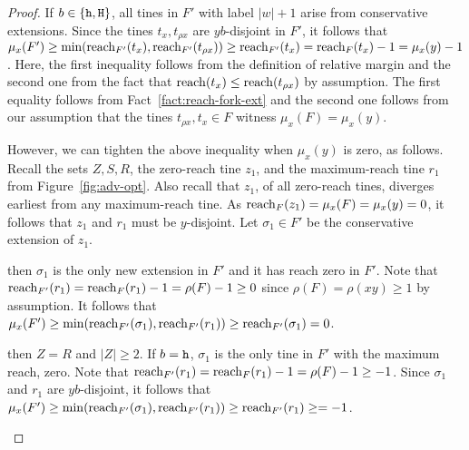 \begin{proof}
  If $b \in \{\mathtt{h}, \mathtt{H}\}$, 
  all tines in $F'$ with label $|w| + 1$ arise from conservative extensions. 
  Since the tines $t_x, t_{\rho x}$ are $yb$-disjoint in $F'$, 
  it follows that $\mu_x(F') \geq \min(\operatorname{reach}_{F'}(t_x), \operatorname{reach}_{F'}(t_{\rho x})) \geq \operatorname{reach}_{F'}(t_x) = \operatorname{reach}_{F}(t_x) - 1 = \mu_x(y) - 1$. 
  Here, the first inequality follows from the definition of relative margin and 
  the second one from the fact that $\operatorname{reach}(t_x) \leq \operatorname{reach}(t_{\rho x})$ by assumption. 
  The first equality follows from Fact~\ref{fact:reach-fork-ext} and 
  the second one follows from our assumption that the tines $t_{\rho x}, t_x\in F$ witness $\mu_x(F) = \mu_x(y)$. 

  However, we can tighten the above inequality when $\mu_x(y)$ is zero, as follows. 
  Recall the sets $Z, S, R$, 
  the zero-reach tine $z_1$, 
  and the maximum-reach tine $r_1$ 
  from Figure~\ref{fig:adv-opt}. 
  Also recall that $z_1$, of all zero-reach tines, 
  diverges earliest from any maximum-reach tine.
  As $\operatorname{reach}_F(z_1) = \mu_x(F) = \mu_x(y) = 0$, 
  it follows that 
  $z_1$ and $r_1$ must be $y$-disjoint.
  Let $\sigma_1 \in F'$ be the conservative extension of $z_1$.


  \begin{description}[font=\normalfont\itshape\space]
    \item[If $\rho(xy) \geq 1$ and $\mu_x(y) = 0$]
      then $\sigma_1$ is the only new extension in $F'$ 
      and it has reach zero in $F'$.
      Note that 
      $\operatorname{reach}_{F'}(r_1) = \operatorname{reach}_F(r_1) - 1 = \rho(F) - 1 \geq 0$ 
      since $\rho(F) = \rho(xy) \geq 1$ by assumption. 
      It follows that $\mu_x(F') \geq \min(\operatorname{reach}_{F'}(\sigma_1), \operatorname{reach}_{F'}(r_1) ) \geq \operatorname{reach}_{F'}(\sigma_1) = 0$. 




    \item[If $\rho(xy) = 0$ and $\mu_x(y) = 0$] 
      then $Z = R$ and $|Z| \geq 2$. 
      If $b = \mathtt{h}$, 
      $\sigma_1$
      is the only tine in $F'$ with the maximum reach, zero. 
      Note that 
      $\operatorname{reach}_{F'}(r_1) = \operatorname{reach}_F(r_1) - 1 = \rho(F) - 1 \geq -1$. 
      Since $\sigma_1$ and $r_1$ are $yb$-disjoint, 
      it follows that 
      $\mu_x(F') \geq \min(\operatorname{reach}_{F'}(\sigma_1), \operatorname{reach}_{F'}(r_1) ) 
      \geq \operatorname{reach}_{F'}(r_1) \geq = -1$.


\end{description}
\end{proof}
